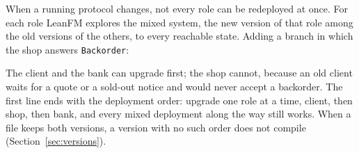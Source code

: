 When a running protocol changes, not every role can be redeployed at once. For
each role LeanFM explores the mixed system, the new version of that role among
the old versions of the others, to every reachable state. Adding a branch in
which the shop answers \texttt{Backorder}:



The client and the bank can upgrade first; the shop cannot, because an old client
waits for a quote or a sold-out notice and would never accept a backorder. The
first line ends with the deployment order: upgrade one role at a time, client,
then shop, then bank, and every mixed deployment along the way still works. When a file
keeps both versions, a version with no such order does not compile
(Section~\ref{sec:versions}).
